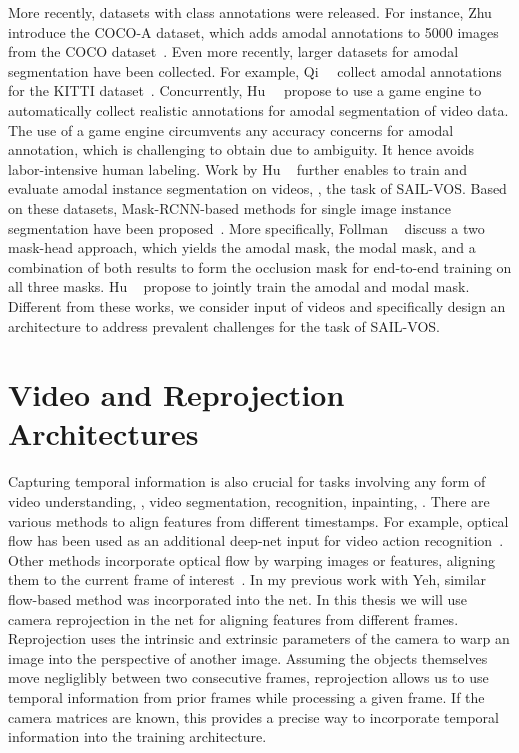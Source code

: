 More recently, datasets with class annotations were released. For instance, Zhu~\etal~\cite{zhu2017semantic} introduce the COCO-A dataset, which adds amodal annotations to 5000  images from the COCO dataset~\cite{lin2014microsoft}. Even more recently, larger datasets for amodal segmentation have been collected. For example, Qi~\etal~\cite{qi2019amodal} collect amodal annotations for the KITTI dataset~\cite{geiger2012we}. Concurrently, Hu~\etal~\cite{hu2019sail} propose to use a game engine to automatically collect realistic  annotations for amodal segmentation of video data. The use of a game engine circumvents any accuracy concerns for amodal annotation, which is %
challenging to obtain due to ambiguity. It hence avoids labor-intensive human labeling. Work by Hu \etal~\cite{hu2019sail} further enables to train and evaluate amodal instance segmentation on videos, \ie, the task of SAIL-VOS. Based on these datasets, Mask-RCNN-based methods for single image instance segmentation have been proposed~\cite{follmann2019learning, hu2019sail}. More specifically, Follman \etal~\cite{follmann2019learning} discuss a two mask-head approach, which yields the amodal mask, the modal mask, and a combination of both results to form the occlusion mask for end-to-end training on all three masks. Hu \etal~\cite{hu2019sail} propose to jointly train the amodal and modal mask. Different from these works, we consider input of videos and specifically design an architecture to address prevalent challenges for the task of SAIL-VOS.


\section{Video and Reprojection Architectures}
Capturing temporal information is also crucial for tasks involving any form of video understanding, \eg, video segmentation, recognition, inpainting, \etc. There are various methods to align features from different timestamps. For example, optical flow has been used as an additional deep-net input for video action recognition~\cite{simonyan2014two, singh2016first}. Other methods incorporate optical flow by warping images or features, aligning them to the current frame of interest~\cite{hu2017maskrnn,gadde2017semantic, kim2019deep}. In my previous work with Yeh, similar flow-based method was incorporated into the net. In this thesis we will use camera reprojection in the net for aligning features from different frames. Reprojection uses the intrinsic and extrinsic parameters of the camera to warp an image into the perspective of another image. Assuming the objects themselves move negliglibly between two consecutive frames, reprojection allows us to use temporal information from prior frames while processing a given frame. If the camera matrices are known, this provides a precise way to incorporate temporal information into the training architecture.
